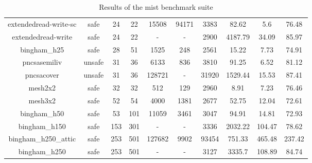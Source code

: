 \begin{table}[h]
{\begin{tabular}{c c c c c c c c c c}
        extendedread-write-sc & safe & 24 & 22 & 15508 & 94171 & 3383 & 82.62 & 5.6 & 76.48 \\
        extendedread-write & safe & 24 & 22 & - & - & 2900 & 4187.79 & 34.09 & 85.97 \\
        bingham\_h25 & safe & 28 & 51 & 1525 & 248 & 2561 & 15.22 & 7.73 & 74.91 \\
        pncsasemiliv & unsafe & 31 & 36 & 6133 & 836 & 3810 & 91.25 & 6.52 & 81.12 \\
        pncsacover & unsafe & 31 & 36 & 128721 & - & 31920 & 1529.44 & 15.53 & 87.41 \\
        mesh2x2 & safe & 32 & 32 & 512 & 129 & 2960 & 8.91 & 7.23 & 76.46 \\
        mesh3x2 & safe & 52 & 54 & 4000 & 1381 & 2677 & 52.75 & 12.04 & 72.61 \\
        bingham\_h50 & safe & 53 & 101 & 11059 & 3461 & 3047 & 94.91 & 14.81 & 72.93 \\
        bingham\_h150 & safe & 153 & 301 & - & - & 3336 & 2032.22 & 104.47 & 78.62 \\
        bingham\_h250\_attic & safe & 253 & 501 & 127682 & 9902 & 93454 & 751.33 & 465.48 & 237.42 \\
        bingham\_h250 & safe & 253 & 501 & - & - & 3127 & 3335.7 & 108.89 & 84.74 \\

\bottomrule
\end{tabular}%
}
\caption{Results of the mist benchmark suite}
\label{tab:mist-results}
\end{table}



